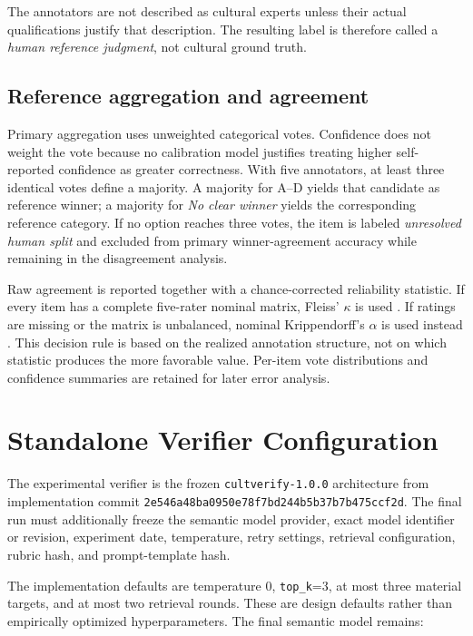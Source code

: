 The annotators are not described as cultural experts unless their actual qualifications justify that description. The resulting label is therefore called a \emph{human reference judgment}, not cultural ground truth.

\subsection{Reference aggregation and agreement}

Primary aggregation uses unweighted categorical votes. Confidence does not weight the vote because no calibration model justifies treating higher self-reported confidence as greater correctness. With five annotators, at least three identical votes define a majority. A majority for A--D yields that candidate as reference winner; a majority for \emph{No clear winner} yields the corresponding reference category. If no option reaches three votes, the item is labeled \emph{unresolved human split} and excluded from primary winner-agreement accuracy while remaining in the disagreement analysis.

Raw agreement is reported together with a chance-corrected reliability statistic. If every item has a complete five-rater nominal matrix, Fleiss' $\kappa$ is used \parencite{fleiss1971kappa}. If ratings are missing or the matrix is unbalanced, nominal Krippendorff's $\alpha$ is used instead \parencite{krippendorff2018content}. This decision rule is based on the realized annotation structure, not on which statistic produces the more favorable value. Per-item vote distributions and confidence summaries are retained for later error analysis.

\section{Standalone Verifier Configuration}

The experimental verifier is the frozen \texttt{cultverify-1.0.0} architecture from implementation commit \texttt{2e546a48ba0950e78f7bd244b5b37b7b475ccf2d}. The final run must additionally freeze the semantic model provider, exact model identifier or revision, experiment date, temperature, retry settings, retrieval configuration, rubric hash, and prompt-template hash.

The implementation defaults are temperature 0, \texttt{top\_k}=3, at most three material targets, and at most two retrieval rounds. These are design defaults rather than empirically optimized hyperparameters. The final semantic model remains:

